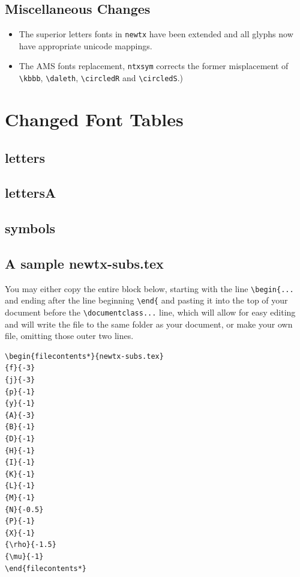 \documentclass[11pt]{article}
\theoremstyle{oldplain}
\theoremstyle{plain}
\begin{document}
\subsection{Miscellaneous Changes}
\begin{itemize}
\item
The superior letters fonts in {\tt newtx} 
have been extended and all glyphs now have appropriate unicode mappings.
\item
The AMS fonts replacement, {\tt ntxsym} corrects the former misplacement of \verb|\kbbb|, \verb|\daleth|, \verb|\circledR| and \verb|\circledS|.)
\end{itemize}
\newpage
\section{Changed Font Tables}
\subsection{letters}
\newpage  
\subsection{lettersA}
\newpage  
\subsection{symbols}
\newpage 
 
\subsection{A sample newtx-subs.tex}
You may either copy the entire block below, starting with the line \verb|\begin{...| and ending after the line beginning \verb|\end{|
and pasting it into the top of your document before the \verb|\documentclass...| line, which will allow for easy editing and will write the file to the same folder as your document, or make your own file, omitting those outer two lines.

\begin{verbatim}
\begin{filecontents*}{newtx-subs.tex}
{f}{-3}
{j}{-3}
{p}{-1}
{y}{-1}
{A}{-3}
{B}{-1}
{D}{-1}
{H}{-1}
{I}{-1}
{K}{-1}
{L}{-1}
{M}{-1}
{N}{-0.5}
{P}{-1}
{X}{-1}
{\rho}{-1.5}
{\mu}{-1}
\end{filecontents*}
\end{verbatim}
\end{document}
